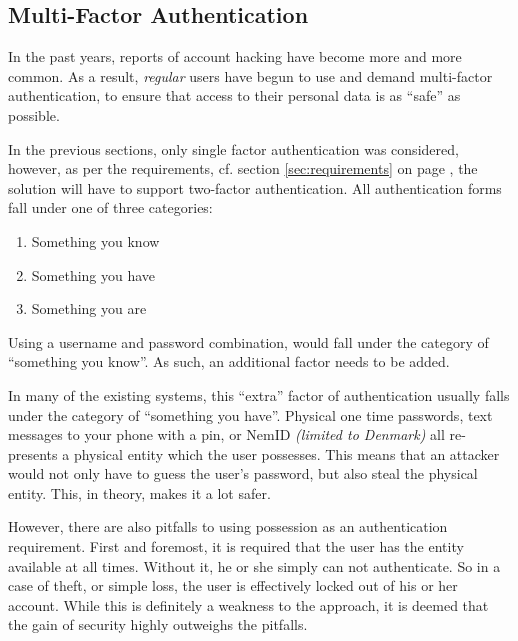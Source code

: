 		\subsection{Multi-Factor Authentication}
			\label{sec:mfa}
			In the past years, reports of account hacking have become more and more common. As a result, \emph{regular} users have begun to use and demand multi-factor authentication, to ensure that access to their personal data is as ``safe'' as possible. 

			In the previous sections, only single factor authentication was considered, however, as per the requirements, cf. section \ref{sec:requirements} on page \pageref{sec:requirements}, the solution will have to support two-factor authentication. All authentication forms fall under one of three categories:
			\begin{enumerate}
				\item Something you know
				\item Something you have
				\item Something you are
			\end{enumerate}
			Using a username and password combination, would fall under the category of ``something you know''. As such, an additional factor needs to be added. 

			In many of the existing systems, this ``extra'' factor of authentication usually falls under the category of ``something you have''. Physical one time passwords, text messages to your phone with a pin, or NemID \emph{(limited to Denmark)} all re-presents a physical entity which the user possesses. This means that an attacker would not only have to guess the user's password, but also steal the physical entity. This, in theory, makes it a lot safer.


			However, there are also pitfalls to using possession as an authentication requirement. First and foremost, it is required that the user has the entity available at all times. Without it, he or she simply can not authenticate. So in a case of theft, or simple loss, the user is effectively locked out of his or her account. While this is definitely a weakness to the approach, it is deemed that the gain of security highly outweighs the pitfalls.

